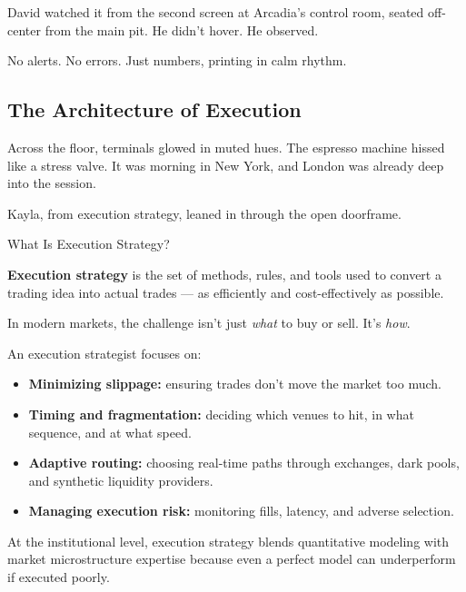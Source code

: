 David watched it from the second screen at Arcadia’s control room, seated off-center from the main pit.
He didn’t hover.
He observed.

No alerts. No errors.
Just numbers, printing in calm rhythm.

\subsection{The Architecture of Execution}

Across the floor, terminals glowed in muted hues.  The espresso machine hissed like a stress valve.  It was morning in 
New York, and London was already deep into the session.

Kayla, from execution strategy, leaned in through the open doorframe.

\medskip

\begin{TechnicalSidebar}{What Is Execution Strategy?}

  \textbf{Execution strategy} is the set of methods, rules, and tools used to convert a trading idea into actual trades — 
  as efficiently and cost-effectively as possible.
  
  \medskip
  
  In modern markets, the challenge isn’t just \textit{what} to buy or sell. It’s \textit{how}.
  
  \medskip
  
  An execution strategist focuses on:
  
  \begin{itemize}
    \item \textbf{Minimizing slippage:} ensuring trades don’t move the market too much.
    \item \textbf{Timing and fragmentation:} deciding which venues to hit, in what sequence, and at what speed.
    \item \textbf{Adaptive routing:} choosing real-time paths through exchanges, dark pools, and synthetic liquidity 
    providers.
    \item \textbf{Managing execution risk:} monitoring fills, latency, and adverse selection.
  \end{itemize}
  
  \medskip
  
  At the institutional level, execution strategy blends quantitative modeling with market microstructure expertise 
  because even a perfect model can underperform if executed poorly.
  
\end{TechnicalSidebar}

